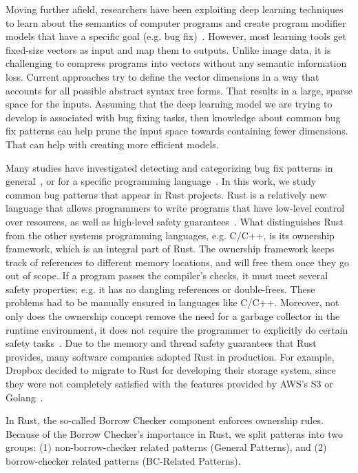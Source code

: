 Moving further afield, researchers have been exploiting deep learning techniques to learn about the semantics of computer programs and create program modifier models that have a specific goal (e.g. bug fix)~\cite{alon2019code2vec,alon2018general,raychev2016learning,bielik2016phog}. However, most learning tools get fixed-size vectors as input and map them to outputs. Unlike image data, it is challenging to compress programs into vectors without any semantic information loss. Current approaches try to define the vector dimensions in a way that accounts for all possible abstract syntax tree forms. That results in a large, sparse space for the inputs. Assuming that the deep learning model we are trying to develop is associated with bug fixing tasks, then knowledge about common bug fix patterns can help prune the input space towards containing fewer dimensions. That can help with creating more efficient models.


Many studies have investigated detecting and categorizing bug fix patterns in general~\cite{islam2021changes,madeiral2018towards,pan2009toward}, or for a specific programming language~\cite{yang2022mining,hanam2016discovering,campos2019discovering}. In this work, we study common bug patterns that appear in Rust projects. Rust is a relatively new language that allows programmers to write programs that have low-level control over resources, as well as high-level safety guarantees~\cite{klabnik2019rust}. What distinguishes Rust from the other systems programming languages, e.g. C/C++, is its ownership framework, which is an integral part of Rust. The ownership framework keeps track of references to different memory locations, and will free them once they go out of scope. If a program passes the compiler’s checks, it must meet several safety properties; e.g. it has no dangling references or double-frees. These problems had to be manually ensured in languages like C/C++. Moreover, not only does the ownership concept remove the need for a garbage collector in the runtime environment, it does not require the programmer to explicitly do certain safety tasks~\cite{qin2020understanding}. Due to the memory and thread safety guarantees that Rust provides, many software companies adopted Rust in production. For example, Dropbox decided to migrate to Rust for developing their storage system, since they were not completely satisfied with the features provided by AWS’s S3 or Golang~\cite{dropbox}.

In Rust, the so-called Borrow Checker component enforces ownership rules. Because of the Borrow Checker's importance in Rust, we split patterns into two groups: (1) non-borrow-checker related patterns (General Patterns), and (2) borrow-checker related patterns (BC-Related Patterns). \\

